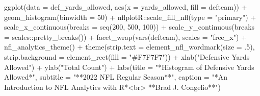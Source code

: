 \documentclass[
  letterpaper,
]{krantz}
\newenvironment{Shaded}{\begin{snugshade}}{\end{snugshade}}
\newcommand{\AttributeTok}[1]{\textcolor[rgb]{0.40,0.45,0.13}{#1}}
\newcommand{\DecValTok}[1]{\textcolor[rgb]{0.68,0.00,0.00}{#1}}
\newcommand{\FunctionTok}[1]{\textcolor[rgb]{0.28,0.35,0.67}{#1}}
\newcommand{\NormalTok}[1]{\textcolor[rgb]{0.00,0.23,0.31}{#1}}
\newcommand{\SpecialCharTok}[1]{\textcolor[rgb]{0.37,0.37,0.37}{#1}}
\newcommand{\StringTok}[1]{\textcolor[rgb]{0.13,0.47,0.30}{#1}}
\begin{document}
\begin{Shaded}
\begin{Highlighting}[]
\FunctionTok{ggplot}\NormalTok{(}\AttributeTok{data =}\NormalTok{ def\_yards\_allowed, }\FunctionTok{aes}\NormalTok{(}\AttributeTok{x =}\NormalTok{ yards\_allowed, }\AttributeTok{fill =}\NormalTok{ defteam)) }\SpecialCharTok{+}
  \FunctionTok{geom\_histogram}\NormalTok{(}\AttributeTok{binwidth =} \DecValTok{50}\NormalTok{) }\SpecialCharTok{+}
\NormalTok{  nflplotR}\SpecialCharTok{::}\FunctionTok{scale\_fill\_nfl}\NormalTok{(}\AttributeTok{type =} \StringTok{"primary"}\NormalTok{) }\SpecialCharTok{+}
  \FunctionTok{scale\_x\_continuous}\NormalTok{(}\AttributeTok{breaks =} \FunctionTok{seq}\NormalTok{(}\DecValTok{200}\NormalTok{, }\DecValTok{500}\NormalTok{, }\DecValTok{100}\NormalTok{)) }\SpecialCharTok{+}
  \FunctionTok{scale\_y\_continuous}\NormalTok{(}\AttributeTok{breaks =}\NormalTok{ scales}\SpecialCharTok{::}\FunctionTok{pretty\_breaks}\NormalTok{()) }\SpecialCharTok{+}
  \FunctionTok{facet\_wrap}\NormalTok{(}\FunctionTok{vars}\NormalTok{(defteam), }\AttributeTok{scales =} \StringTok{"free\_x"}\NormalTok{) }\SpecialCharTok{+}
  \FunctionTok{nfl\_analytics\_theme}\NormalTok{() }\SpecialCharTok{+}
  \FunctionTok{theme}\NormalTok{(}\AttributeTok{strip.text =} \FunctionTok{element\_nfl\_wordmark}\NormalTok{(}\AttributeTok{size =}\NormalTok{ .}\DecValTok{5}\NormalTok{),}
        \AttributeTok{strip.background =} \FunctionTok{element\_rect}\NormalTok{(}\AttributeTok{fill =} \StringTok{"\#F7F7F7"}\NormalTok{)) }\SpecialCharTok{+}
  \FunctionTok{xlab}\NormalTok{(}\StringTok{"Defensive Yards Allowed"}\NormalTok{) }\SpecialCharTok{+}
  \FunctionTok{ylab}\NormalTok{(}\StringTok{"Total Count"}\NormalTok{) }\SpecialCharTok{+}
  \FunctionTok{labs}\NormalTok{(}\AttributeTok{title =} \StringTok{"*Histogram of Defensive Yards Allowed*"}\NormalTok{,}
       \AttributeTok{subtitle =} \StringTok{"**2022 NFL Regular Season**"}\NormalTok{,}
       \AttributeTok{caption =} \StringTok{"*An Introduction to NFL Analytics with R*\textless{}br\textgreater{}}
\StringTok{       **Brad J. Congelio**"}\NormalTok{)}
\end{Highlighting}
\end{Shaded}
\end{document}
